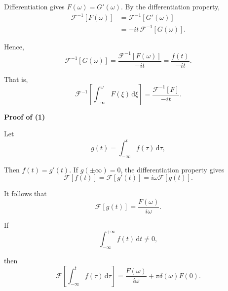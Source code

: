 \documentclass[11pt,a4paper]{article}
\theoremstyle{definition}
\theoremstyle{plain}
\begin{document}
Differentiation gives \(F(\omega)=G'(\omega)\). By the differentiation
property,
\[
\begin{aligned}
\mathcal F^{-1}[F(\omega)]
&=\mathcal F^{-1}[G'(\omega)]\\
&=-it\,\mathcal F^{-1}[G(\omega)].
\end{aligned}
\]

Hence,
\[
\mathcal F^{-1}[G(\omega)]
=\frac{\mathcal F^{-1}[F(\omega)]}{-it}
=\frac{f(t)}{-it}.
\]

That is,
\[
\mathcal F^{-1}\!\left[
\int_{-\infty}^{\omega}F(\xi)\,\mathrm d\xi
\right]
=\frac{\mathcal F^{-1}[F]}{-it}.
\]

\textbf{Proof of (1)}\par\nopagebreak[4]
Let
\[
g(t)=\int_{-\infty}^{t}f(\tau)\,\mathrm d\tau,
\]

Then \(f(t)=g'(t)\). If \(g(\pm\infty)=0\), the differentiation property
gives
\[
\mathcal F[f(t)]
=\mathcal F[g'(t)]
=i\omega\mathcal F[g(t)].
\]

It follows that
\[
\mathcal F[g(t)]=\frac{F(\omega)}{i\omega}.
\]

If
\[
\int_{-\infty}^{+\infty}f(t)\,\mathrm dt\ne0,
\]

then
\[
\mathcal F\!\left[
\int_{-\infty}^{t}f(\tau)\,\mathrm d\tau
\right]
=\frac{F(\omega)}{i\omega}
+\pi\delta(\omega)F(0).
\]
\end{document}
